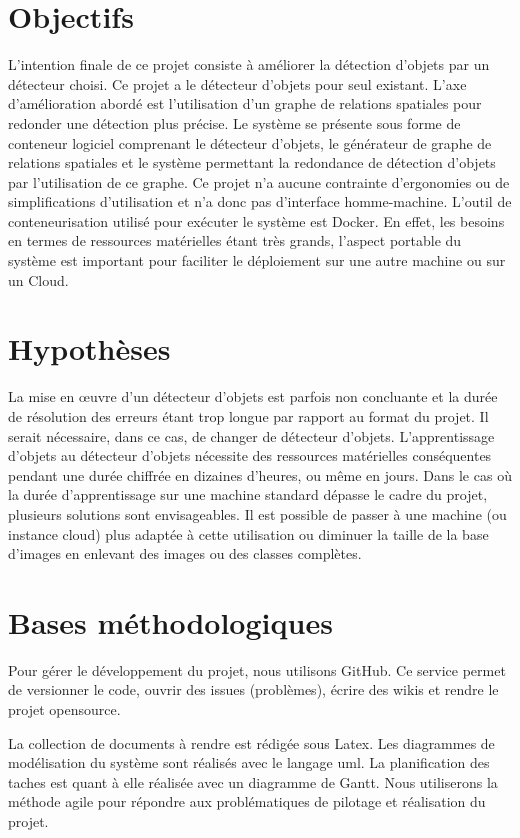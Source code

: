 \documentclass[debug,nodate,hideweeklyreports]{polytech/polytech}
\begin{document}
\section{Objectifs}

L’intention finale de ce projet consiste à améliorer la détection d’objets par un détecteur choisi. Ce projet a le détecteur d’objets pour seul existant. 
L’axe d’amélioration abordé est l’utilisation d’un graphe de relations spatiales pour redonder une détection plus précise.
Le système se présente sous forme de conteneur logiciel comprenant le détecteur d’objets, le générateur de graphe de relations spatiales et le système permettant la redondance de détection d’objets par l’utilisation de ce graphe.
Ce projet n’a aucune contrainte d’ergonomies ou de simplifications d’utilisation et n’a donc pas d’interface homme-machine.
L’outil de conteneurisation utilisé pour exécuter le système est Docker. En effet, les besoins en termes de ressources matérielles étant très grands, l’aspect portable du système est important pour faciliter le déploiement sur une autre machine ou sur un Cloud.

\section{Hypothèses}

La mise en œuvre d’un détecteur d’objets est parfois non concluante et la durée de résolution des erreurs étant trop longue par rapport au format du projet. Il serait nécessaire, dans ce cas, de changer de détecteur d’objets.
L’apprentissage d’objets au détecteur d’objets nécessite des ressources matérielles conséquentes pendant une durée chiffrée en dizaines d’heures, ou même en jours. Dans le cas où la durée d’apprentissage sur une machine standard dépasse le cadre du projet, plusieurs solutions sont envisageables. Il est possible de passer à une machine (ou instance cloud) plus adaptée à cette utilisation ou diminuer la taille de la base d’images en enlevant des images ou des classes complètes.

\section{Bases méthodologiques}

Pour gérer le développement du projet, nous utilisons GitHub. Ce service permet de versionner le code, ouvrir des issues (problèmes), écrire des wikis et rendre le projet \gls{opensource}.

La collection de documents à rendre est rédigée sous Latex. Les diagrammes de modélisation du système sont réalisés avec le langage \gls{uml}. La planification des taches est quant à elle réalisée avec un diagramme de Gantt. Nous utiliserons la méthode agile pour répondre aux problématiques de pilotage et réalisation du projet. 
\end{document}
